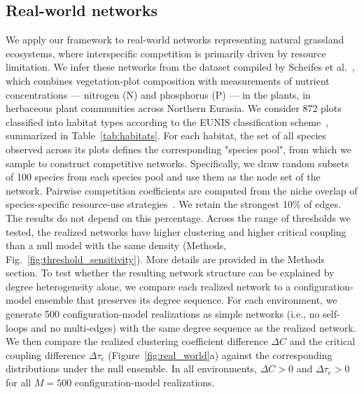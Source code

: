 \documentclass[a4paper,12pt]{article}
\begin{document}
\subsection{Real-world networks}\label{sec:real_world_networks}
We apply our framework to real-world networks representing natural grassland ecosystems, where interspecific competition is primarily driven by resource limitation. 
We infer these networks from the dataset compiled by Scheifes et al.~\cite{Scheifes2024}, which combines vegetation-plot composition with measurements of nutrient concentrations --- nitrogen (N) and phosphorus (P) --- in the plants, in herbaceous plant communities across Northern Eurasia. 
We consider 872 plots classified into habitat types according to the EUNIS classification scheme~\cite{davies2004eunis}, summarized in Table~\ref{tab:habitats}. 
For each habitat, the set of all species observed across its plots defines the corresponding "species pool", from which we sample to construct competitive networks. 
Specifically, we draw random subsets of 100 species from each species pool and use them as the node set of the network.
Pairwise competition coefficients are computed from the niche overlap of species-specific resource-use strategies~\cite{haraldsson2023emerging}. 
We retain the strongest 10\% of edges.
The results do not depend on this percentage. Across the range of thresholds we tested, the realized networks have higher clustering and higher critical coupling than a null model with the same density (Methods, Fig.~\ref{fig:threshold_sensitivity}).
More details are provided in the Methods section.
To test whether the resulting network structure can be explained by degree heterogeneity alone, we compare each realized network to a configuration-model ensemble that preserves its degree sequence. 
For each environment, we generate 500 configuration-model realizations as simple networks (i.e., no self-loops and no multi-edges) with the same degree sequence as the realized network. 
We then compare the realized clustering coefficient difference $\Delta C$ and the critical coupling difference $\Delta \tau_{\text{c}}$ (Figure~\ref{fig:real_world}a) against the corresponding distributions under the null ensemble. 
In all environments, $\Delta C>0$ and $\Delta \tau_{\text{c}} >0$ for all $M=500$ configuration-model realizations.
\end{document}
